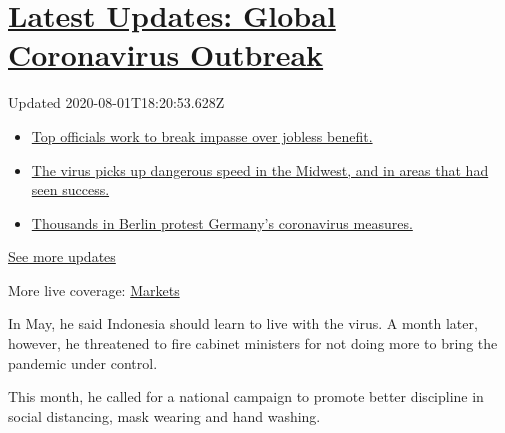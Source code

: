 \hypertarget{latest-updates-global-coronavirus-outbreak}{%
\section{\texorpdfstring{\href{https://www.nytimes.com/2020/08/01/world/coronavirus-covid-19.html?action=click\&pgtype=Article\&state=default\&region=MAIN_CONTENT_1\&context=storylines_live_updates}{Latest
Updates: Global Coronavirus
Outbreak}}{Latest Updates: Global Coronavirus Outbreak}}\label{latest-updates-global-coronavirus-outbreak}}

Updated 2020-08-01T18:20:53.628Z

\begin{itemize}
\tightlist
\item
  \href{https://www.nytimes.com/2020/08/01/world/coronavirus-covid-19.html?action=click\&pgtype=Article\&state=default\&region=MAIN_CONTENT_1\&context=storylines_live_updates\#link-3ac56579}{Top
  officials work to break impasse over jobless benefit.}
\item
  \href{https://www.nytimes.com/2020/08/01/world/coronavirus-covid-19.html?action=click\&pgtype=Article\&state=default\&region=MAIN_CONTENT_1\&context=storylines_live_updates\#link-8796723}{The
  virus picks up dangerous speed in the Midwest, and in areas that had
  seen success.}
\item
  \href{https://www.nytimes.com/2020/08/01/world/coronavirus-covid-19.html?action=click\&pgtype=Article\&state=default\&region=MAIN_CONTENT_1\&context=storylines_live_updates\#link-25930521}{Thousands
  in Berlin protest Germany's coronavirus measures.}
\end{itemize}

\href{https://www.nytimes.com/2020/08/01/world/coronavirus-covid-19.html?action=click\&pgtype=Article\&state=default\&region=MAIN_CONTENT_1\&context=storylines_live_updates}{See
more updates}

More live coverage:
\href{https://www.nytimes.com/live/2020/07/31/business/stock-market-today-coronavirus?action=click\&pgtype=Article\&state=default\&region=MAIN_CONTENT_1\&context=storylines_live_updates}{Markets}

In May, he said Indonesia should learn to live with the virus. A month
later, however, he threatened to fire cabinet ministers for not doing
more to bring the pandemic under control.

This month, he called for a national campaign to promote better
discipline in social distancing, mask wearing and hand washing.

